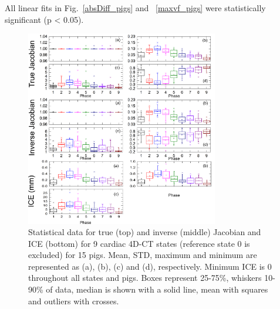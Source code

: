 All linear fits in Fig.~\ref{absDiff_pigs} and ~\ref{maxvf_pigs} were statistically significant (p < 0.05).



\newpage

\begin{figure}[H]
	\begin{center}		
		\includegraphics[width=0.75\textwidth]{./Vmm/Images/Jacobian_data_pigs.png}
		\caption{Statistical data for true (top) and inverse (middle) Jacobian and ICE (bottom) for 9 cardiac 4D-CT states (reference state 0 is excluded) for 15 pigs. Mean, STD, maximum and minimum are represented as (a), (b), (c) and (d), respectively.
		Minimum ICE is 0 throughout all states and pigs. Boxes represent 25-75\%, whiskers 10-90\% of data, median is shown with a solid line, mean with squares and outliers with crosses.}
		\label{jacobian_data_pigs}
	\end{center}
\end{figure}

\newpage


